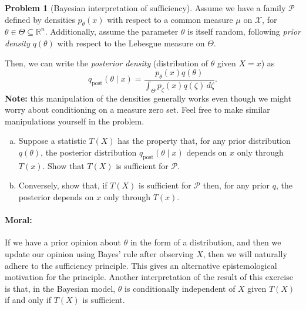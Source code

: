 \documentclass{article}
\newcommand{\cP}{\mathcal{P}}
\newcommand{\cX}{\mathcal{X}}
\newcommand{\RR}{\mathbb{R}}
\theoremstyle{definition}
\newtheorem{problem}{Problem}
\begin{document}
\begin{problem}[Bayesian interpretation of sufficiency]
  Assume we have a family $\cP$ defined by densities $p_{\theta}(x)$ with respect to a common measure $\mu$ on $\cX$, for $\theta\in \Theta \subseteq \RR^n$. Additionally, assume the parameter $\theta$ is itself random, following {\em prior density} $q(\theta)$ with respect to the Lebesgue measure on $\Theta$. 

  Then, we can write the {\em posterior density} (distribution of $\theta$ given $X=x$) as
  \[
  q_{\text{post}}(\theta \mid x) = \frac{p_\theta(x)q(\theta)}{\int_{\Theta} p_\zeta(x)q(\zeta) \,d \zeta}.
  \]
  {\bf Note:} this manipulation of the densities generally works even though we might worry about conditioning on a measure zero set. Feel free to make similar manipulations yourself in the problem.

  \begin{enumerate}[(a)]
  \item Suppose a statistic $T(X)$ has the property that, for any prior distribution $q(\theta)$, the posterior distribution $q_{\text{post}}(\theta \mid x)$ depends on $x$ only through $T(x)$. Show that $T(X)$ is sufficient for $\cP$.

    
    
  \item Conversely, show that, if $T(X)$ is sufficient for $\cP$ then, for any prior $q$, the posterior depends on $x$ only through $T(x)$.
    
    

  \end{enumerate}

\paragraph{Moral:} If we have a prior opinion about $\theta$ in the form of a distribution, and then we update our opinion using Bayes' rule after observing $X$, then we will naturally adhere to the sufficiency principle. This gives an alternative epistemological motivation for the principle. Another interpretation of the result of this exercise is that, in the Bayesian model, $\theta$ is conditionally independent of $X$ given $T(X)$ if and only if $T(X)$ is sufficient.

\end{problem}
\end{document}
